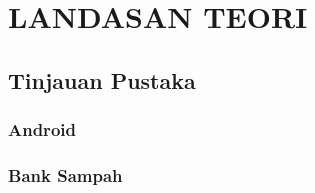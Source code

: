 \chapter{LANDASAN TEORI}
\label{sec:landasan_teori}

\section{Tinjauan Pustaka}

\subsection{Android}

\subsection{Bank Sampah} 